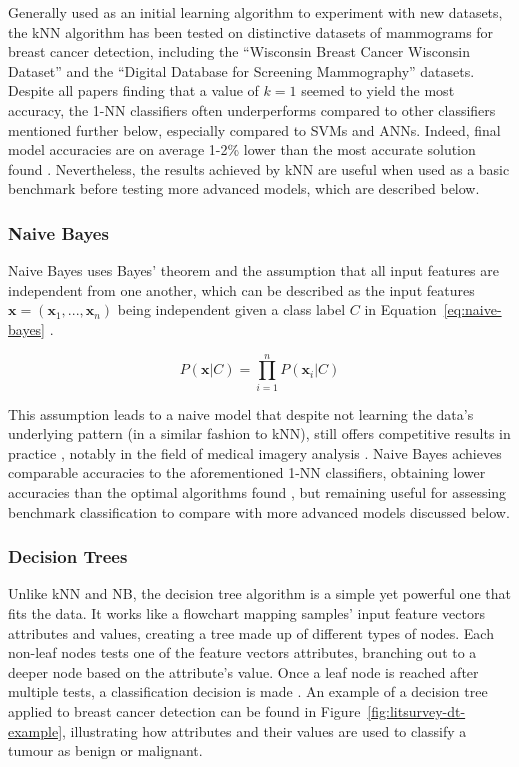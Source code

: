 Generally used as an initial learning algorithm to experiment with new datasets, the kNN algorithm has been tested on distinctive datasets of mammograms for breast cancer detection, including the ``Wisconsin Breast Cancer Wisconsin Dataset'' \cite{Wolberg1995} and the ``Digital Database for Screening Mammography'' \cite{DDSMdataset2001} datasets. Despite all papers finding that a value of $k=1$ seemed to yield the most accuracy, the 1-NN classifiers often underperforms compared to other classifiers mentioned further below, especially compared to SVMs and ANNs. Indeed, final model accuracies are on average 1-2\% lower than the most accurate solution found \cite{Yue2018} \cite{Asri2016} \cite{Montazeri2016}. Nevertheless, the results achieved by kNN are useful when used as a basic benchmark before testing more advanced models, which are described below.

\subsubsection{Naive Bayes}

Naive Bayes uses Bayes' theorem and the assumption that all input features are independent from one another, which can be described as the input features $\textbf{x}=(\textbf{x}_1, ..., \textbf{x}_n)$ being independent given a class label $C$ in Equation~\ref{eq:naive-bayes} \cite{rish2001empirical}.

\begin{equation}
\label{eq:naive-bayes}
    P(\textbf{x}|C)=\prod_{i=1}^{n}P(\textbf{x}_i|C)
\end{equation}

This assumption leads to a naive model that despite not learning the data's underlying pattern (in a similar fashion to kNN), still offers competitive results in practice \cite{russell2002artificial}, notably in the field of medical imagery analysis \cite{rish2001empirical}. Naive Bayes achieves comparable accuracies to the aforementioned 1-NN classifiers, obtaining lower accuracies than the optimal algorithms found \cite{Yue2018} \cite{Montazeri2016}, but remaining useful for assessing benchmark classification to compare with more advanced models discussed below.

\subsubsection{Decision Trees}

Unlike kNN and NB, the decision tree algorithm is a simple yet powerful one that fits the data. It works like a flowchart mapping samples' input feature vectors attributes and values, creating a tree made up of different types of nodes. Each non-leaf nodes tests one of the feature vectors attributes, branching out to a deeper node based on the attribute's value. Once a leaf node is reached after multiple tests, a classification decision is made \cite{quinlan2014c4}. An example of a decision tree applied to breast cancer detection can be found in Figure~\ref{fig:litsurvey-dt-example}, illustrating how attributes and their values are used to classify a tumour as benign or malignant.

